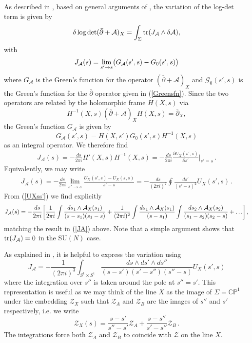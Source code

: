 \documentclass[12pt]{article}
\def \be  {\begin{equation}}
\def \ee  {\end{equation}}
\def \tr {\mathop{\rm tr}\nolimits}
\numberwithin{equation}{section}
\begin{document}
As described in \cite{Bullimore:2011ni}, based on general arguments of \cite{Quillen}, the variation of the log-det term is given by
\be
\delta \log \det (\bar{\partial}+\mathcal{A})_X = \int_\Sigma \tr (J_{\mathcal{A}} \wedge \delta \mathcal{A}),
\ee
with
\begin{align}
J_{\mathcal{A}}(s) = \lim_{s' \rightarrow s}\bigl(G_{\mathcal{A}}(s',s) - G_0(s',s)\bigr) \notag 
\end{align}
where $G_\mathcal{A}$ is the Green's function for the operator $(\bar{\partial} + \mathcal{A})_X$ and $\mathcal{G}_0(s',s)$ is the Green's function for the $\bar{\partial}$ operator given in (\ref{Greensfn}). Since the two operators are related by the holomorphic frame $H(X,s)$ via
\be
H^{-1}(X,s) (\bar{\partial}+\mathcal{A})_X H(X,s) = \bar{\partial}_X,
\ee
the Green's function $G_{\mathcal{A}}$ is given by
\be
G_\mathcal{A}(s',s) = H(X,s') G_0(s',s) H^{-1}(X,s)
\ee
as an integral operator. We therefore find
\begin{align}
J_\mathcal{A} (s) = -\frac{ds}{2\pi i} H'(X,s) H^{-1}(X,s) = -\frac{ds}{2 \pi i} \frac{\partial U_X(s',s)}{\partial s'} \bigg|_{s'=s}\,.
\end{align}
Equivalently, we may write
\begin{align}
J_\mathcal{A} (s) = -\frac{ds}{2 \pi i} \lim_{s' \rightarrow s}\frac{U_X(s',s)-U_X(s,s)}{s'-s} = - \frac{ds}{(2 \pi i)^2} \oint \frac{ds'}{(s'-s)^2} U_X(s',s) \,.
\end{align}
From (\ref{UXss'}) we find explicitly 
\begin{align}
J_{\mathcal{A}}(s) = -\frac{ds}{2 \pi i} \biggl[ \frac{1}{2 \pi i} \int  \frac{ds_1 \wedge \mathcal{A}_{X}(s_1)}{(s-s_1)(s_1-s)} + \frac{1}{(2 \pi i)^2} \int \frac{ds_1 \wedge \mathcal{A}_{X}(s_1)}{(s-s_1)} \int \frac{ds_2 \wedge \mathcal{A}_{X}(s_2)}{(s_1-s_2)(s_2-s)} + \ldots \biggr]\,, \notag
\end{align}
matching the result in (\ref{JA}) above. Note that a simple argument shows that $\tr(J_\mathcal{A})=0$ in the SU$(N)$ case.

As explained in \cite{Bullimore:2011ni}, it is helpful to express the variation using
\be
J_{\mathcal{A}} = - \frac{1}{(2\pi i)^3}\int_{S^1 \times S^1} \frac{ds \wedge ds' \wedge ds''}{(s-s')(s'-s'')(s''-s)}  U_X(s',s) 
\ee
where the integration over $s''$ is taken around the pole at $s''=s'$. This representation is useful as we may think of the line $X$ as the image of $\Sigma = \mathbb{CP}^1$ under the embedding $\mathcal{Z}_X$ such that $\mathcal{Z}_A$ and $\mathcal{Z}_B$ are the images of $s''$ and $s'$ respectively, i.e. we write 
\be
\mathcal{Z}_X(s) = \frac{s-s'}{s''-s'}\mathcal{Z}_A + \frac{s-s''}{s'-s''}\mathcal{Z}_B\,.
\ee
The integrations force both $\mathcal{Z}_A$ and $\mathcal{Z}_B$ to coincide with $\mathcal{Z}$ on the line $X$.
\end{document}
